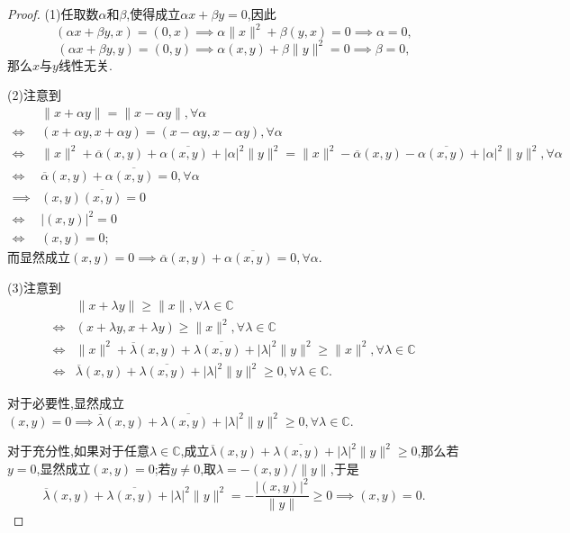 \documentclass[lang = cn, scheme = chinese]{elegantbook}
\begin{document}
	\begin{proof}
		
		(1)任取数$\alpha$和$\beta$,使得成立$\alpha x+\beta y=0$,因此
		$$
		(\alpha x+\beta y,x)=(0,x)\implies \alpha\|x\|^2+\beta(y,x)=0\implies \alpha=0,
		$$
		$$
		(\alpha x+\beta y,y)=(0,y)\implies \alpha(x,y)+\beta\|y\|^2=0\implies \beta=0,
		$$
		那么$x$与$y$线性无关.
		
		(2)注意到
		\begin{align*}
			&\|x+\alpha y \|=\|x-\alpha y\|,\forall\alpha\\
			\iff & (x+\alpha y,x+\alpha y)=(x-\alpha y,x-\alpha y),\forall\alpha\\
			\iff & \|x\|^2+\overline{\alpha}(x,y)+\alpha\overline{(x,y)}+|\alpha|^2\|y\|^2=
			\|x\|^2-\overline{\alpha}(x,y)-\alpha\overline{(x,y)}+|\alpha|^2\|y\|^2,\forall\alpha\\
			\iff & \overline{\alpha}(x,y)+\alpha\overline{(x,y)}=0,\forall\alpha\\
			\implies & (x,y)\overline{(x,y)}=0\\
			\iff & |(x,y)|^2=0\\
			\iff & (x,y)=0;
		\end{align*}
		而显然成立$(x,y)=0\implies\overline{\alpha}(x,y)+\alpha\overline{(x,y)}=0,\forall\alpha$.
		
		(3)注意到
		\begin{align*}
			&\|x+\lambda y \|\ge \|x\|,\forall\lambda\in\mathbb{C}\\
			\iff & (x+\lambda y,x+\lambda y) \ge \|x\|^2,\forall\lambda\in\mathbb{C}\\
			\iff & \|x\|^2+\overline{\lambda}(x,y)+\lambda\overline{(x,y)}+|\lambda|^2\|y\|^2\ge \|x\|^2,\forall\lambda\in\mathbb{C}\\
			\iff & \overline{\lambda}(x,y)+\lambda\overline{(x,y)}+|\lambda|^2\|y\|^2\ge 0,\forall\lambda\in\mathbb{C}.
		\end{align*}
		
		对于必要性,显然成立$(x,y)=0\implies\overline{\lambda}(x,y)+\lambda\overline{(x,y)}+|\lambda|^2\|y\|^2\ge 0,\forall\lambda\in\mathbb{C}$.
		
		对于充分性,如果对于任意$\lambda\in\mathbb{C}$,成立$\overline{\lambda}(x,y)+\lambda\overline{(x,y)}+|\lambda|^2\|y\|^2\ge 0$,那么若$y=0$,显然成立$(x,y)=0$;若$y\ne0$,取$\lambda=-(x,y)/\|y\|$,于是
		$$
		\overline{\lambda}(x,y)+\lambda\overline{(x,y)}+|\lambda|^2\|y\|^2
		=-\frac{|(x,y)|^2}{\|y\|}\ge 0\implies (x,y)=0.
		$$
	\end{proof}
	
\end{document}
